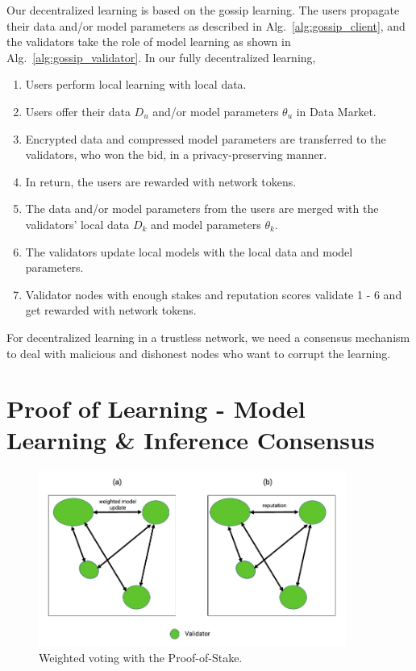 \documentclass[11pt,letterpaper]{article}
\begin{document}
Our decentralized learning is based on the gossip learning. The users propagate their data and/or model parameters as described in Alg.~\ref{alg:gossip_client}, and the validators take the role of model learning as shown in Alg.~\ref{alg:gossip_validator}. In our fully decentralized learning,
\begin{enumerate}
  \item Users perform local learning with local data.
  \item Users offer their data $D_u$ and/or model parameters $\theta_u$ in Data Market.
  \item Encrypted data and compressed model parameters are transferred to the validators, who won the bid, in a privacy-preserving manner.
  \item In return, the users are rewarded with network tokens.
  \item The data and/or model parameters from the users are merged with the validators' local data $D_k$ and model parameters $\theta_k$.
  \item The validators update local models with the local data and model parameters.
  \item Validator nodes with enough stakes and reputation scores validate 1 - 6 and get rewarded with network tokens.
\end{enumerate}
For decentralized learning in a trustless network, we need a consensus mechanism to deal with malicious and dishonest nodes who want to corrupt the learning.

\section{Proof of Learning - Model Learning \& Inference Consensus}

\begin{figure}[t]
\centering
	\includegraphics[width=0.9\textwidth]{fig/consensus.jpg}
\caption{Weighted voting with the Proof-of-Stake.} 
\label{fig:voting}
\end{figure}
\end{document}
